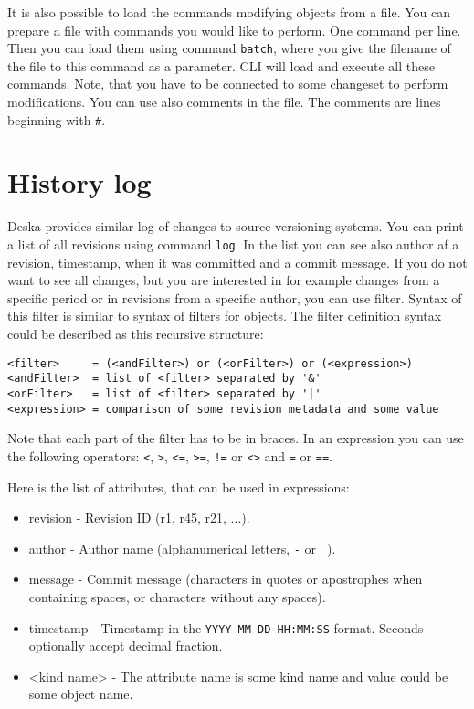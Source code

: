 \documentclass[deska]{subfiles}
\begin{document}
It is also possible to load the commands modifying objects from a file. You can prepare a file with commands you would
like to perform. One command per line. Then you can load them using command {\tt batch}, where you give the filename
of the file to this command as a parameter. CLI will load and execute all these commands. Note, that you have to be
connected to some changeset to perform modifications. You can use also comments in the file. The comments are lines
beginning with {\tt \#}.

\section{History log}

Deska provides similar log of changes to source versioning systems. You can print a list of all revisions using
command {\tt log}. In the list you can see also author af a revision, timestamp, when it was committed and a commit
message. If you do not want to see all changes, but you are interested in for example changes from a specific period
or in revisions from a specific author, you can use filter. Syntax of this filter is similar to syntax of filters for
objects. The filter definition syntax could be described as this recursive structure:

\begin{verbatim}
<filter>     = (<andFilter>) or (<orFilter>) or (<expression>)
<andFilter>  = list of <filter> separated by '&'
<orFilter>   = list of <filter> separated by '|'
<expression> = comparison of some revision metadata and some value
\end{verbatim}

Note that each part of the filter has to be in braces. In an expression you can use the following operators: {\tt <}, {\tt >},
{\tt <=}, {\tt >=}, {\tt !=} or {\tt <>} and {\tt =} or {\tt ==}.

Here is the list of attributes, that can be used in expressions:

\begin{itemize}
    \item{revision} - Revision ID (r1, r45, r21, ...).
    \item{author} - Author name (alphanumerical letters, {\tt -} or {\tt \_}).
    \item{message} - Commit message (characters in quotes or apostrophes when containing spaces, or characters without any spaces).
    \item{timestamp} - Timestamp in the {\tt YYYY-MM-DD HH:MM:SS} format.  Seconds optionally accept decimal fraction.
    \item{<kind name>} - The attribute name is some kind name and value could be some object name.
\end{itemize}
\end{document}
